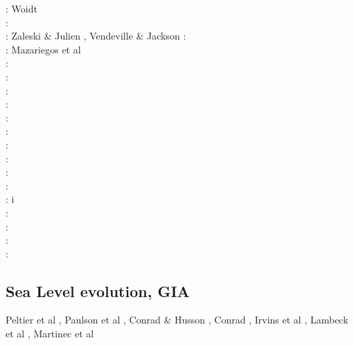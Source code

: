 \begin{scriptsize}
\nineteenseventyeight: Woidt \cite{woid78}\\
\nineteenninetyone: \cite{tars91}\\
\nineteenninetytwo: Zaleski \& Julien \cite{zaju92},  Vendeville \& Jackson \cite{veja92}
\nineteenninetythree: \cite{nabr93}\cite{vasv93}\cite{wejv93}\cite{wein93}\\
\nineteenninetysix: Mazariegos et al \cite{maar96}\\
\nineteenninetyeight: \cite{giju98}\\
\twothousandfour: \cite{istt04}\cite{geim04}\cite{mcmg04}\\
\twothousandfive: \cite{gebi05}\\
\twothousandsix: \cite{maqs06}\\
\twothousandseven: \cite{huja07}\cite{maqs07}\\
\twothousandnine: \cite{grba09}\\
\twothousandten: \cite{albe10}\cite{albi10}\cite{inbe10}\cite{inbe10b}\cite{albs10}\\
\twothousandeleven: \cite{brfo11}\\
\twothousandtwelve: \cite{fejr12}\cite{liqi12}\cite{grbe12}\cite{albe12}\cite{grbi12}\cite{goib12}\cite{rukb12}\\
\twothousandthirteen: \cite{gobi13}\cite{nipc13}\\
\twothousandfourteen: \cite{bakp14}\cite{feka14a}\cite{feka14b}\cite{ghbu14}\cite{nifh14}i\cite{peel14}\\
\twothousandfifteen: \cite{feka15}\cite{cofk15}\\
\twothousandsixteen: \cite{masg16}\cite{albe16}\\
\twothousandseventeen: \cite{grbe17}\cite{henf17}\\
\twothousandnineteen: \cite{hadv19}\cite{clcc19}
\end{scriptsize}

\subsection{Sea Level evolution, GIA}

\begin{scriptsize}
Peltier et al \cite{pefc78},
Paulson et al \cite{pazw07},
Conrad \& Husson \cite{cohu09},
Conrad \cite{conr13},
Irvins et al \cite{ivjw13},
Lambeck et al \cite{larp14},
Martinec et al \cite{makv18}
\end{scriptsize}

